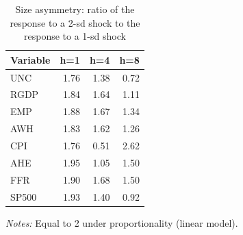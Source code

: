 \begin{table}[htbp]
\centering
\caption{Size asymmetry: ratio of the response to a 2-sd shock to the response to a 1-sd shock}
\label{tab:size}
\begin{tabular}{lrrr}
\toprule
Variable & h=1 & h=4 & h=8 \\
\midrule
UNC & 1.76 & 1.38 & 0.72 \\
RGDP & 1.84 & 1.64 & 1.11 \\
EMP & 1.88 & 1.67 & 1.34 \\
AWH & 1.83 & 1.62 & 1.26 \\
CPI & 1.76 & 0.51 & 2.62 \\
AHE & 1.95 & 1.05 & 1.50 \\
FFR & 1.90 & 1.68 & 1.50 \\
SP500 & 1.93 & 1.40 & 0.92 \\
\bottomrule
\end{tabular}
\begin{minipage}{0.95\linewidth}\footnotesize\emph{Notes:} Equal to 2 under proportionality (linear model).\end{minipage}
\end{table}